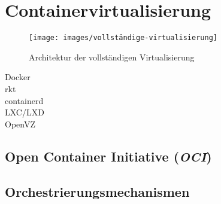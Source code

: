 \section{Containervirtualisierung}
\label{sec:containervirtualisierung}
\begin{figure}[htbp]
    \centering
    \texttt{[image: images/vollständige-virtualisierung]}
    \caption{Architektur der vollständigen Virtualisierung}
\label{fig:architektur-vollständige-virtualisierung}
\end{figure}
\begin{description}
    \item [Docker] \blindtext
    \item [rkt] \blindtext
    \item [containerd] \blindtext
    \item [LXC/LXD] \blindtext
    \item [OpenVZ] \blindtext
\end{description}
\subsection{Open Container Initiative (\emph{OCI})}
\label{sec:open-container-initiative}
\subsection{Orchestrierungsmechanismen}
\label{sec:orchestrierungsmechanismen}
